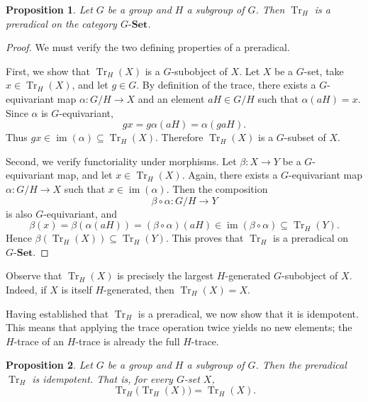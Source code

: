 \documentclass[10pt,a4paper]{amsart}
\newtheorem{proposition}{Proposition}
\begin{document}
\begin{proposition}\label{prop:tr_preradical}
Let $G$ be a group and $H$ a subgroup of $G$. Then $\operatorname{Tr}_H$ is a preradical on the category $G\text{-}\mathbf{Set}$.
\end{proposition}

\begin{proof}
We must verify the two defining properties of a preradical.

First, we show that $\operatorname{Tr}_H(X)$ is a $G$-subobject of $X$. Let $X$ be a $G$-set, take $x \in \operatorname{Tr}_H(X)$, and let $g \in G$. By definition of the trace, there exists a $G$-equivariant map $\alpha \colon G/H \longrightarrow X$ and an element $aH \in G/H$ such that $\alpha(aH) = x$. Since $\alpha$ is $G$-equivariant,
\[
g x = g \alpha(aH) = \alpha(g aH).
\]
Thus $g x \in \operatorname{im}(\alpha) \subseteq \operatorname{Tr}_H(X)$. Therefore $\operatorname{Tr}_H(X)$ is a $G$-subset of $X$.

Second, we verify functoriality under morphisms. Let $\beta \colon X \longrightarrow Y$ be a $G$-equivariant map, and let $x \in \operatorname{Tr}_H(X)$. Again, there exists a $G$-equivariant map $\alpha \colon G/H \longrightarrow X$ such that $x \in \operatorname{im}(\alpha)$. Then the composition
\[
\beta \circ \alpha \colon G/H \longrightarrow Y
\]
is also $G$-equivariant, and
\[
\beta(x) = \beta(\alpha(aH)) = (\beta \circ \alpha)(aH) \in \operatorname{im}(\beta \circ \alpha) \subseteq \operatorname{Tr}_H(Y).
\]
Hence $\beta(\operatorname{Tr}_H(X)) \subseteq \operatorname{Tr}_H(Y)$. This proves that $\operatorname{Tr}_H$ is a preradical on $G\text{-}\mathbf{Set}$.
\end{proof}

Observe that $\operatorname{Tr}_H(X)$ is precisely the largest $H$-generated $G$-subobject of $X$. Indeed, if $X$ is itself $H$-generated, then $\operatorname{Tr}_H(X) = X$.

Having established that $\operatorname{Tr}_H$ is a preradical, we now show that it is idempotent. This means that applying the trace operation twice yields no new elements; the $H$-trace of an $H$-trace is already the full $H$-trace.

\begin{proposition}\label{prop:tr_idempotent}
Let $G$ be a group and $H$ a subgroup of $G$. Then the preradical $\operatorname{Tr}_H$ is idempotent. That is, for every $G$-set $X$,
\[
\operatorname{Tr}_H\bigl(\operatorname{Tr}_H(X)\bigr) = \operatorname{Tr}_H(X).
\]
\end{proposition}
\end{document}

